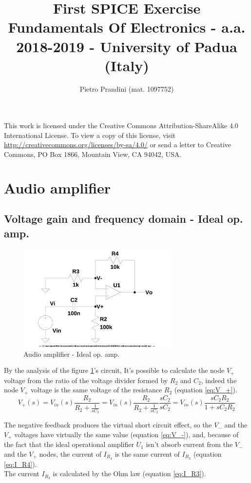\documentclass[10pt,a4paper]{article}
\title{First SPICE Exercise\\{\small{Fundamentals Of Electronics - a.a. 2018-2019 -
University of Padua (Italy)}}}
\author{Pietro Prandini (mat. 1097752)}
\begin{document}
\maketitle

\begin{center}
\tiny{This work is licensed under the Creative Commons Attribution-ShareAlike 4.0 International License. To view a copy of this license, visit \href{http://creativecommons.org/licenses/by-sa/4.0/}{http://creativecommons.org/licenses/by-sa/4.0/} or send a letter to Creative Commons, PO Box 1866, Mountain View, CA 94042, USA.}
\end{center}

\section{Audio amplifier}
\subsection{Voltage gain and frequency domain - Ideal op. amp.}
\begin{figure}[h]
  \centering
  \includegraphics[width=8cm]{schematics/1d1.jpg}
  \caption{Audio amplifier - Ideal op. amp.}
  \label{1d1schematics}
\end{figure}

By the analysis of the figure \ref{1d1schematics}'s circuit, It's possible to calculate the node $V_+$ voltage from the ratio of the voltage divider formed by $R_2$ and $C_2$, indeed the node $V_+$ voltage is the same voltage of the resistance $R_2$ (equation \ref{eq:V_+}).\\
\begin{equation} \label{eq:V_+}
  V_+(s) = V_{in}(s)\frac{R_2}{R_2+\frac{1}{sC_2}} =
  V_{in}(s)\frac{R_2}{R_2+\frac{1}{sC_2}}\frac{sC_2}{sC_2} =
  V_{in}(s)\frac{sC_2R_2}{1+sC_2R_2}
\end{equation}

The negative feedback produces the virtual short circuit effect, so the $V_-$ and the $V_+$ voltages have virtually the same value (equation \ref{eq:V_-}), and, because of the fact that the ideal operational amplifier $U_1$ isn't absorb current from the $V_-$ and the $V_+$ nodes, the current of $I_{R_4}$ is the same current of $I_{R_3}$ (equation \ref{eq:I_R4}).\\
The current $I_{R_3}$ is calculated by the Ohm law (equation \ref{eq:I_R3}).\\
\end{document}
